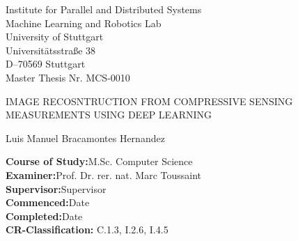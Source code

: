 \begin{titlepage}

\centering
\sffamily
%
\small
Institute for Parallel and Distributed Systems \\
Machine Learning and Robotics Lab\\
\null\vspace{0.5cm}
University of Stuttgart\\
Universitätsstraße 38\\
D–70569 Stuttgart\\

\null\vspace{0.9cm}
Master Thesis Nr. MCS-0010

\large
\null\vspace{0.8cm}
{\huge IMAGE RECOSNTRUCTION FROM COMPRESSIVE SENSING MEASUREMENTS USING DEEP LEARNING\\[12pt] 
} 
\null\vspace{0.1cm}

\small
Luis Manuel Bracamontes Hernandez

\raggedright
\null\vspace{0.7cm}
\textbf{Course of Study:}\null\hspace{0.1cm}M.Sc. Computer Science\\
\null\vspace{0.5cm}
\textbf{Examiner:}\null\hspace{0.1cm}Prof. Dr. rer. nat. Marc Toussaint\\
\null\vspace{0.01cm}
\textbf{Supervisor:}\null\hspace{0.1cm}Supervisor\\
\null\vspace{0.5cm}
\textbf{Commenced:}\null\hspace{0.1cm}Date\\
\null\vspace{0.01cm}
\textbf{Completed:}\null\hspace{0.1cm}Date\\
\null\vspace{0.5cm}
\textbf{CR-Classification:}\null\hspace{0.1cm} C.1.3, I.2.6, I.4.5 \\


\vspace{0.5cm}
\end{titlepage}



